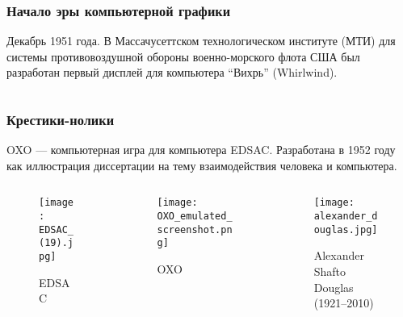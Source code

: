 \documentclass[10pt]{beamer}
\begin{document}
	\frame{\subsectionpage}
	
	\begin{frame}\frametitle{Начало эры компьютерной графики}
	
		Декабрь 1951 года. В Массачусеттском технологическом институте (МТИ) для системы противовоздушной обороны военно-морского флота США был разработан первый дисплей для компьютера “Вихрь” (Whirlwind).		
		\begin{columns}[T]
			\begin{column}{0.5\textwidth}					
			\end{column}
			\begin{column}{0.5\textwidth}
			\end{column}
		\end{columns}
		


	
	\end{frame}
	
\renewcommand\UrlFont{\color{red}\rmfamily\itshape}	

\begin{frame}\frametitle{Крестики-нолики}{
	OXO --- компьютерная игра для компьютера EDSAC. Разработана в 1952 году как иллюстрация диссертации на тему взаимодействия человека и компьютера.
	\begin{columns}[T]
		\begin{column}{0.33\textwidth}
			\begin{figure}
				\centering
				\texttt{[image: EDSAC\_(19).jpg]}
				\caption{EDSAC}
			\end{figure}
		\end{column}
		\begin{column}{0.33\textwidth}
			\begin{figure}
			\centering
			\texttt{[image: OXO\_emulated\_screenshot.png]}
			\caption{OXO}
			\end{figure}
		\end{column}
		\begin{column}{0.33\textwidth}
			\begin{figure}
			\centering
			\texttt{[image: alexander\_douglas.jpg]}
			\caption{\centering Alexander Shafto Douglas (1921–2010)}
			\end{figure}
		\end{column}
	\end{columns}
	
}\end{frame}
\end{document}
